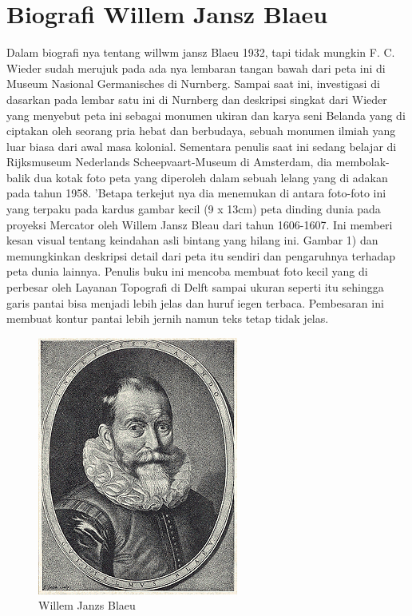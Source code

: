 

\section{Biografi Willem Jansz Blaeu}
Dalam biografi nya tentang willwm jansz Blaeu 1932, tapi tidak mungkin F. C. Wieder sudah merujuk pada ada nya lembaran tangan bawah 
dari peta ini di Museum Nasional Germanisches di Nurnberg. Sampai saat ini, investigasi di dasarkan pada lembar satu ini di Nurnberg 
dan deskripsi singkat dari Wieder yang menyebut peta ini sebagai monumen ukiran dan karya seni Belanda yang di ciptakan oleh seorang 
pria hebat dan berbudaya, sebuah monumen ilmiah yang luar biasa dari awal masa kolonial. Sementara penulis saat ini sedang belajar 
di Rijksmuseum Nederlands Scheepvaart-Museum di Amsterdam, dia membolak-balik dua kotak foto peta yang diperoleh dalam sebuah lelang yang di adakan pada tahun 1958. 
'Betapa terkejut nya dia menemukan di antara foto-foto ini yang terpaku pada kardus gambar kecil (9 x 13cm) peta dinding dunia 
pada proyeksi Mercator oleh Willem Jansz Bleau dari tahun 1606-1607. Ini memberi kesan visual tentang keindahan asli bintang yang hilang ini. 
Gambar 1) dan memungkinkan deskripsi detail dari peta itu sendiri dan pengaruhnya terhadap peta dunia lainnya. 
Penulis buku ini mencoba membuat foto kecil yang di perbesar oleh Layanan Topografi di Delft sampai ukuran seperti itu 
sehingga garis pantai bisa menjadi lebih jelas dan huruf iegen terbaca. Pembesaran ini membuat kontur pantai lebih jernih namun teks tetap tidak jelas. 



\begin{figure}[ht]
\centerline{\includegraphics[width=.5\textwidth]{figures/willem_jansz_blaeu.png}}	
\caption{Willem Janzs Blaeu}	
\label{willem_jansz_blaeu}
\end{figure}



